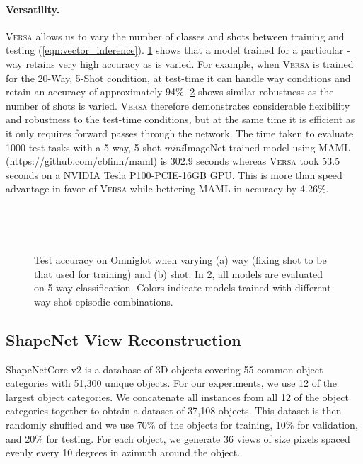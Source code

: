 \documentclass{article}
\newcommand{\Versa}{\textsc{Versa}}
\begin{document}
\paragraph{Versatility.} \Versa{} allows us to vary the number of classes  and shots  between training and testing (\cref{eqn:vector_inference}). \cref{fig:acc2way} shows that a model trained for a particular -way retains very high accuracy as  is varied. For example, when  \Versa{} is trained for the 20-Way, 5-Shot condition, at test-time it can handle  way conditions and retain an accuracy of approximately 94\%. \cref{fig:acc2shot} shows similar robustness as the number of shots  is varied. \Versa{} therefore demonstrates considerable flexibility and robustness to the test-time conditions, but at the same time it is efficient as it only requires forward passes through the network. The time taken to evaluate 1000 test tasks with a 5-way, 5-shot \textit{mini}ImageNet trained model using MAML (\url{https://github.com/cbfinn/maml}) is 302.9 seconds whereas \Versa{} took 53.5 seconds on a NVIDIA Tesla P100-PCIE-16GB GPU. This is more than  speed advantage in favor of \Versa{} while bettering MAML in accuracy by 4.26\%.
\begin{figure}[ht]
	\centering
    \hfill
	\begin{subfigure}[b]{.40\textwidth}
		\centering
         \\
		\label{fig:acc2way}
	\end{subfigure} \hfill
	\begin{subfigure}[b]{.40\textwidth}
		\centering
         \\
		\label{fig:acc2shot}
	\end{subfigure}
    \hfill \hspace{0cm}
	\caption{Test accuracy on Omniglot when varying (a) way (fixing shot to be that used for training) and (b) shot. In \cref{fig:acc2shot}, all models are evaluated on 5-way classification. Colors indicate models trained with different way-shot episodic combinations.}
	\label{fig:omni_flexibility}
\end{figure}





\subsection{ShapeNet View Reconstruction}
\label{sec:view_recovery}
ShapeNetCore v2 \citep{shapenet2015} is a database of 3D objects covering 55 common object categories with 51,300 unique objects. For our experiments, we use 12 of the largest object categories. We concatenate all instances from all 12 of the object categories together to obtain a dataset of 37,108 objects. This dataset is then randomly shuffled and we use 70\% of the objects for training, 10\% for validation, and 20\% for testing. For each object, we generate 36 views of size  pixels spaced evenly every 10 degrees in azimuth around the object.
\end{document}
